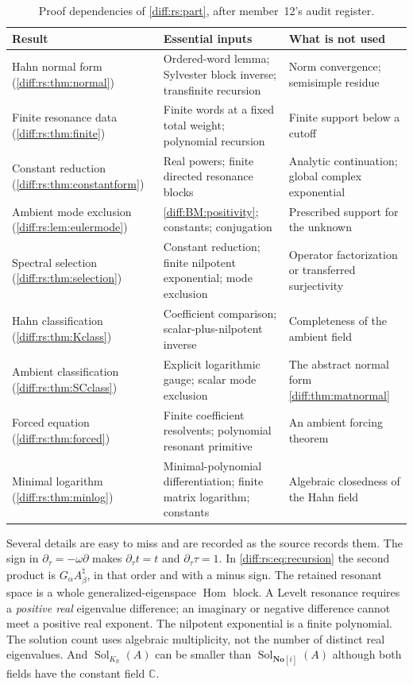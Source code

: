 \documentclass[11pt,letterpaper]{article}
\numberwithin{equation}{section}
\theoremstyle{definition}
\theoremstyle{remark}
\newcommand{\SC}{\mathbf{No}[i]}
\newcommand{\R}{\mathbb R}
\newcommand{\C}{\mathbb C}
\newcommand{\der}{\partial}
\newcommand{\Hom}{\operatorname{Hom}}
\newcommand{\derT}{\der_{\tau}}
\newcommand{\KR}{K_{\R}}
\newcommand{\Sol}{\operatorname{Sol}}
\begin{document}
\begin{table}[htbp]
\centering\small
\caption{Proof dependencies of \cref{diff:rs:part}, after member~12's audit
register.}
\label{diff:rs:tab:dependencies}
\begin{tabularx}{\textwidth}{@{}L{0.25\textwidth}YL{0.28\textwidth}@{}}
\toprule
Result & Essential inputs & What is not used \\
\midrule
Hahn normal form (\cref{diff:rs:thm:normal}) & Ordered-word lemma; Sylvester
block inverse; transfinite recursion & Norm convergence; semisimple residue \\
Finite resonance data (\cref{diff:rs:thm:finite}) & Finite words at a fixed
total weight; polynomial recursion & Finite support below a cutoff \\
Constant reduction (\cref{diff:rs:thm:constantform}) & Real powers; finite
directed resonance blocks & Analytic continuation; global complex
exponential \\
Ambient mode exclusion (\cref{diff:rs:lem:eulermode}) & \ref{diff:BM:positivity};
constants; conjugation & Prescribed support for the unknown \\
Spectral selection (\cref{diff:rs:thm:selection}) & Constant reduction; finite
nilpotent exponential; mode exclusion & Operator factorization or transferred
surjectivity \\
Hahn classification (\cref{diff:rs:thm:Kclass}) & Coefficient comparison;
scalar-plus-nilpotent inverse & Completeness of the ambient field \\
Ambient classification (\cref{diff:rs:thm:SCclass}) & Explicit logarithmic
gauge; scalar mode exclusion & The abstract normal form
\cref{diff:thm:matnormal} \\
Forced equation (\cref{diff:rs:thm:forced}) & Finite coefficient resolvents;
polynomial resonant primitive & An ambient forcing theorem \\
Minimal logarithm (\cref{diff:rs:thm:minlog}) & Minimal-polynomial
differentiation; finite matrix logarithm; constants & Algebraic closedness of the Hahn field \\
\bottomrule
\end{tabularx}
\end{table}

Several details are easy to miss and are recorded as the source records them.
The sign in $\derT=-\omega\der$ makes $\derT t=t$ and $\derT\tau=1$. In
\cref{diff:rs:eq:recursion} the second product is $G_{\alpha}A^{\natural}_{\beta}$,
in that order and with a minus sign. The retained resonant space is a whole
generalized-eigenspace $\Hom$ block. A Levelt resonance requires a
\emph{positive real} eigenvalue difference; an imaginary or negative difference
cannot meet a positive real exponent. The nilpotent exponential is a finite
polynomial. The solution count uses algebraic multiplicity, not the number of
distinct real eigenvalues. And $\Sol_{\KR}(A)$ can be smaller than
$\Sol_{\SC}(A)$ although both fields have the constant field $\C$.
\end{document}
